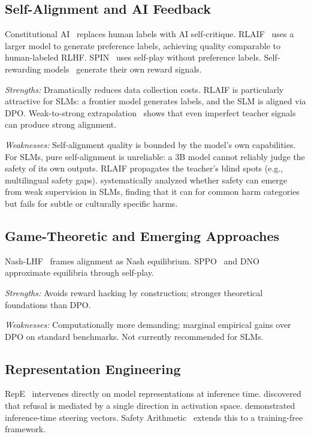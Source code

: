 \documentclass[12pt,a4paper]{article}
\begin{document}
\subsection{Self-Alignment and AI Feedback}

Constitutional AI~\citep{bai2022constitutional} replaces human labels with AI self-critique. RLAIF~\citep{lee2023rlaif} uses a larger model to generate preference labels, achieving quality comparable to human-labeled RLHF. SPIN~\citep{chen2024spin} uses self-play without preference labels. Self-rewarding models~\citep{yuan2024selfrewarding} generate their own reward signals.

\emph{Strengths:} Dramatically reduces data collection costs. RLAIF is particularly attractive for SLMs: a frontier model generates labels, and the SLM is aligned via DPO. Weak-to-strong extrapolation~\citep{zheng2024expo} shows that even imperfect teacher signals can produce strong alignment.

\emph{Weaknesses:} Self-alignment quality is bounded by the model's own capabilities. For SLMs, pure self-alignment is unreliable: a 3B model cannot reliably judge the safety of its own outputs. RLAIF propagates the teacher's blind spots (e.g., multilingual safety gaps). \citet{weaksupervision2026} systematically analyzed whether safety can emerge from weak supervision in SLMs, finding that it can for common harm categories but fails for subtle or culturally specific harms.

\subsection{Game-Theoretic and Emerging Approaches}

Nash-LHF~\citep{munos2024nash} frames alignment as Nash equilibrium. SPPO~\citep{wu2024sppo} and DNO~\citep{rosset2024dno} approximate equilibria through self-play.

\emph{Strengths:} Avoids reward hacking by construction; stronger theoretical foundations than DPO.

\emph{Weaknesses:} Computationally more demanding; marginal empirical gains over DPO on standard benchmarks. Not currently recommended for SLMs.

\subsection{Representation Engineering}

RepE~\citep{zou2023representation} intervenes directly on model representations at inference time. \citet{arditi2024refusal} discovered that refusal is mediated by a single direction in activation space. \citet{turner2023activation} demonstrated inference-time steering vectors. Safety Arithmetic~\citep{safetyarithmetic2025} extends this to a training-free framework.
\end{document}
